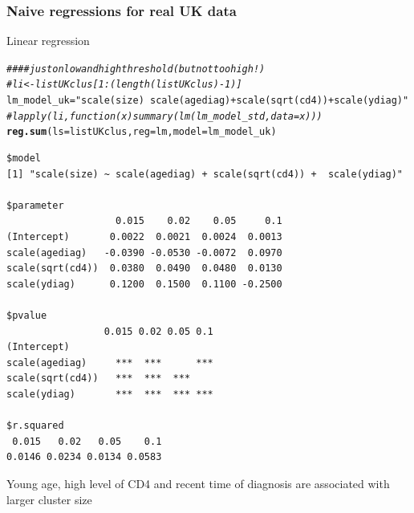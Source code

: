 \documentclass[]{revtex4}\usepackage[]{graphicx}\usepackage[]{color}
\makeatletter
\newcommand{\hlstr}[1]{\textcolor[rgb]{0.192,0.494,0.8}{#1}}%
\newcommand{\hlcom}[1]{\textcolor[rgb]{0.678,0.584,0.686}{\textit{#1}}}%
\newcommand{\hlstd}[1]{\textcolor[rgb]{0.345,0.345,0.345}{#1}}%
\newcommand{\hlkwb}[1]{\textcolor[rgb]{0.69,0.353,0.396}{#1}}%
\newcommand{\hlkwc}[1]{\textcolor[rgb]{0.333,0.667,0.333}{#1}}%
\newcommand{\hlkwd}[1]{\textcolor[rgb]{0.737,0.353,0.396}{\textbf{#1}}}%
\newenvironment{kframe}{%
 \def\at@end@of@kframe{}%
 \ifinner\ifhmode%
  \def\at@end@of@kframe{\end{minipage}}%
  \begin{minipage}{\columnwidth}%
 \fi\fi%
 \def\FrameCommand##1{\hskip\@totalleftmargin \hskip-\fboxsep
 \colorbox{shadecolor}{##1}\hskip-\fboxsep
     \hskip-\linewidth \hskip-\@totalleftmargin \hskip\columnwidth}%
 \MakeFramed {\advance\hsize-\width
   \@totalleftmargin\z@ \linewidth\hsize
   \@setminipage}}%
 {\par\unskip\endMakeFramed%
 \at@end@of@kframe}
\newenvironment{knitrout}{}{} %
\makeatother
\begin{document}
\subsubsection{Naive regressions for real UK data}
Linear regression
\begin{knitrout}
\color{fgcolor}\begin{kframe}
\begin{alltt}
\hlcom{#### just on low and high threshold (but not too high !)}
\hlcom{# li <- listUKclus[ 1:(length(listUKclus)-1) ]}
\hlstd{lm_model_uk} \hlkwb{=} \hlstr{"scale(size) ~ scale(agediag) + scale(sqrt(cd4)) +  scale(ydiag)"}
\hlcom{# lapply(li, function(x) summary(lm(lm_model_std, data = x)))}
\hlkwd{reg.sum}\hlstd{(}\hlkwc{ls} \hlstd{= listUKclus,} \hlkwc{reg} \hlstd{= lm,} \hlkwc{model} \hlstd{= lm_model_uk)}
\end{alltt}
\begin{verbatim}
$model
[1] "scale(size) ~ scale(agediag) + scale(sqrt(cd4)) +  scale(ydiag)"

$parameter
                   0.015    0.02    0.05     0.1
(Intercept)       0.0022  0.0021  0.0024  0.0013
scale(agediag)   -0.0390 -0.0530 -0.0072  0.0970
scale(sqrt(cd4))  0.0380  0.0490  0.0480  0.0130
scale(ydiag)      0.1200  0.1500  0.1100 -0.2500

$pvalue
                 0.015 0.02 0.05 0.1
(Intercept)                         
scale(agediag)     ***  ***      ***
scale(sqrt(cd4))   ***  ***  ***    
scale(ydiag)       ***  ***  *** ***

$r.squared
 0.015   0.02   0.05    0.1 
0.0146 0.0234 0.0134 0.0583 
\end{verbatim}
\end{kframe}
\end{knitrout}
Young age, high level of CD4 and recent time of diagnosis are associated with larger cluster size
\end{document}
